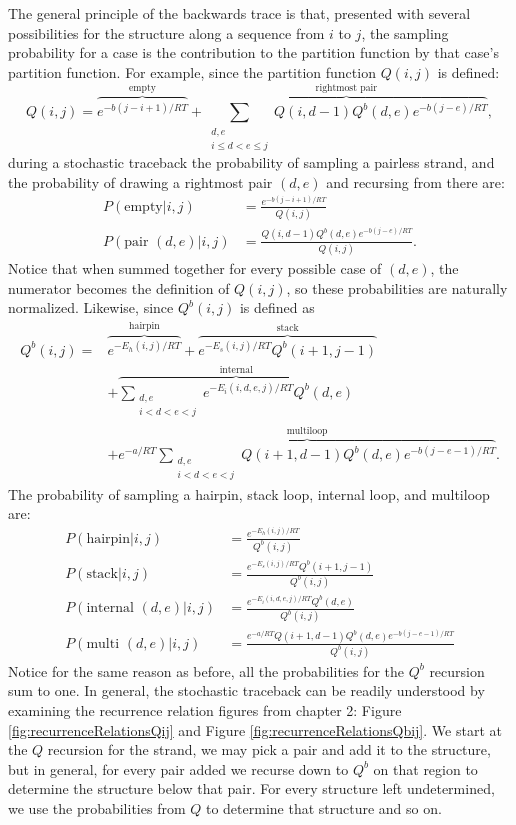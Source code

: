 The general principle of the backwards trace is that,
presented with several possibilities for the structure along a
sequence from $i$ to $j$, the sampling probability for a case is the
contribution to the partition function by that case's partition
function. For example, since the partition function $Q(i, j)$ is defined:
\begin{equation}
Q(i,j) = \overbrace{e^{-b(j-i+1)/RT}}^{\text{empty}} + \overbrace{\sum_{\substack{ d,e \\ i \leq d < e \leq j}}Q(i, d - 1) Q^b(d, e) e^{-b(j-e)/RT}}^{\text{rightmost pair}},
\end{equation}
during a stochastic traceback the probability of sampling a pairless
strand, and the probability of drawing a rightmost pair $(d,e)$ and
recursing from there are:
\begin{align}
P(\text{empty} | i, j) &= \frac{e^{-b(j-i+1)/RT} }{Q(i,j)} \\ 
P(\text{pair } (d,e) | i, j ) &= \frac{ Q(i, d-1) Q^b(d,e) e^{-b(j-e)/RT}}{Q(i,j)}. 
\end{align}
Notice that when summed together for every possible case of $(d,e)$,
the numerator becomes the definition of $Q(i,j)$, so these
probabilities are naturally normalized. Likewise, since $Q^b(i,j)$ is
defined as 
\begin{equation}
\begin{split}
 Q^b(i, j) =& \overbrace{e^{-E_h(i,j)/RT}}^{\text{hairpin}} +
 \overbrace{e^{-E_s(i, j)/RT} Q^b(i+1, j-1)}^{\text{stack}} \\ 
& + \overbrace{\sum_{\substack{d,e \\ i < d< e< j}} e^{-E_i(i, d, e, j)/RT}Q^b(d,e)}^{\text{internal}} \\ 
& + \overbrace{e^{-a/RT} \sum_{\substack{d,e \\ i < d< e< j}} Q(i+1, d-1) Q^b(d,e) e^{-b(j-e-1)/RT}}^{\text{multiloop}}.
\end{split}
\end{equation}
The probability of sampling a hairpin, stack loop, internal loop, and multiloop are:
\begin{align}
P(\text{hairpin} | i, j) &= \frac{ e^{-E_h(i,j)/RT} } { Q^b(i,j) } \\
P(\text{stack} | i, j ) &= \frac{ e^{-E_s(i,j)/RT} Q^b(i+1, j-1) } {Q^b(i,j)}  \\
P(\text{internal } (d, e) | i, j) &= \frac{e^{-E_i(i, d, e, j)/RT} Q^b(d,e)}{Q^b(i,j) }\\
P(\text{multi }(d,e) |i, j ) &= \frac{ e^{-a/RT} Q(i + 1, d-1) Q^b(d,e) e^{-b(j-e-1)/RT} } { Q^b(i,j)} 
\end{align}
Notice for the same reason as before, all the probabilities for the
$Q^b$ recursion sum to one. In general, the stochastic traceback can
be readily understood by examining the recurrence relation figures
from chapter 2: Figure \ref{fig:recurrenceRelationsQij} and Figure
\ref{fig:recurrenceRelationsQbij}. We start at the $Q$ recursion for
the strand, we may pick a pair and add it to the structure, but in
general, for every pair added we recurse down to $Q^b$ on that region
to determine the structure below that pair. For every structure left
undetermined, we use the probabilities from $Q$ to determine that
structure and so on. 

